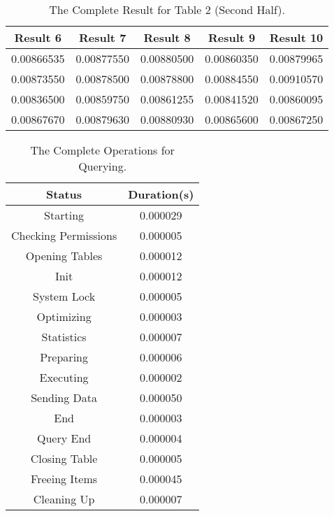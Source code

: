 \documentclass[12pt]{article}
\begin{document}
\begin{table}[h]
\centering
\begin{tabular}{|c|c|c|c|c|}\hline
Result 6&Result 7&Result 8&Result 9&Result 10\\\hline
0.00866535&0.00877550&0.00880500&0.00860350&0.00879965\\
0.00873550&0.00878500&0.00878800&0.00884550&0.00910570\\\hline
0.00836500&0.00859750&0.00861255&0.00841520&0.00860095\\
0.00867670&0.00879630&0.00880930&0.00865600&0.00867250\\\hline
\end{tabular}
\caption{The Complete Result for Table 2 (Second Half).}
\label{tab:Margin_settings}
\end{table}
\begin{table}[h]
\centering
\begin{tabular}{|c|c|}\hline
Status&Duration(s)\\\hline
Starting&0.000029\\\hline
Checking Permissions&0.000005\\\hline
Opening Tables&0.000012\\\hline
Init&0.000012\\\hline
System Lock&0.000005\\\hline
Optimizing&0.000003\\\hline
Statistics&0.000007\\\hline
Preparing&0.000006\\\hline
Executing&0.000002\\\hline
Sending Data&0.000050\\\hline
End&0.000003\\\hline
Query End&0.000004\\\hline
Closing Table&0.000005\\\hline
Freeing Items&0.000045\\\hline
Cleaning Up&0.000007\\\hline
\end{tabular}
\caption{The Complete Operations for Querying.}
\label{tab:Margin_settings}
\end{table}
\end{document}
